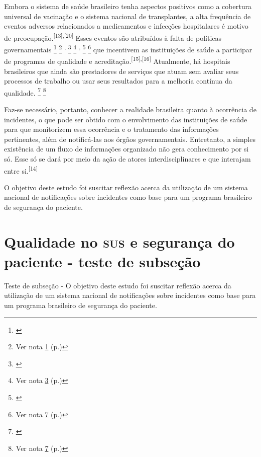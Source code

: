 \documentclass{article}
\newcounter{fn1}
\newcounter{fn2}
\newcounter{fn3}
\newcounter{fn4}
\newcounter{fn5}
\newcounter{fn6}
\newcounter{fn7}
\newcounter{fn8}
\begin{document}
Embora o sistema de saúde brasileiro tenha aspectos positivos como a cobertura
universal de
vacinação e o sistema nacional de transplantes, a alta frequência de eventos
adversos
relacionados a medicamentos e infecções hospitalares é motivo de preocupação.\textsuperscript{[}\textsuperscript{13}\textsuperscript{]}\textsuperscript{,}\textsuperscript{[}\textsuperscript{20}\textsuperscript{]}
Esses eventos são atribuídos à falta de políticas governamentais
%
		{\footnote{ \label{ftn:fn2}}}%
		{\footnote{Ver nota \ref{ftn:fn2} (p.\pageref{ftn:fn2})}}
\textsuperscript{,}
%
		{\footnote{ \label{ftn:fn3}}}%
		{\footnote{Ver nota \ref{ftn:fn3} (p.\pageref{ftn:fn3})}}
\textsuperscript{,}%
		{\footnote{ \label{ftn:fn4}}}%
		{\footnote{Ver nota \ref{ftn:fn4} (p.\pageref{ftn:fn4})}}
que incentivem as instituições de saúde a participar de programas de qualidade e
acreditação.\textsuperscript{[}\textsuperscript{15}\textsuperscript{]}\textsuperscript{,}\textsuperscript{[}\textsuperscript{16}\textsuperscript{]}
Atualmente, há hospitais brasileiros que ainda são prestadores de serviços que
atuam
sem avaliar seus processos de trabalho ou usar seus resultados para a melhoria
contínua da
qualidade.%
		{\footnote{ \label{ftn:fn4}}}%
		{\footnote{Ver nota \ref{ftn:fn4} (p.\pageref{ftn:fn4})}}

Faz-se necessário, portanto, conhecer a realidade brasileira quanto à ocorrência
de
incidentes, o que pode ser obtido com o envolvimento das instituições de saúde
para que
monitorizem essa ocorrência e o tratamento das informações pertinentes, além de
notificá-las
aos órgãos governamentais. Entretanto, a simples existência de um fluxo de
informações
organizado não gera conhecimento por si só. Esse só se dará por meio da ação de
atores
interdisciplinares e que interajam entre si.\textsuperscript{[}\textsuperscript{14}\textsuperscript{]}

O objetivo deste estudo foi suscitar reflexão acerca da utilização de um sistema
nacional
de notificações sobre incidentes como base para um programa brasileiro de
segurança do
paciente.
\section{Qualidade no \textsc{sus} e segurança do paciente - teste de subseção}

Teste de subseção - O objetivo deste estudo foi suscitar reflexão acerca da
utilização de um sistema nacional
de notificações sobre incidentes como base para um programa brasileiro de
segurança do
paciente.
\end{document}
